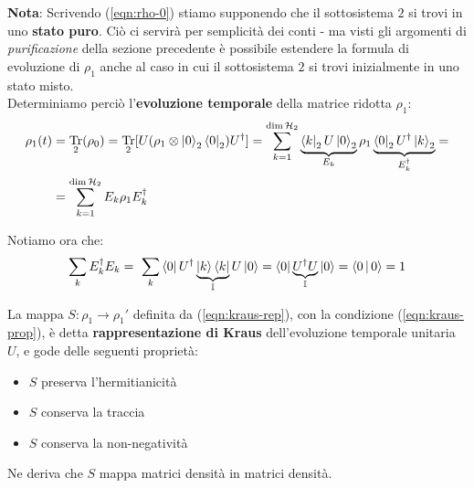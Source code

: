 \documentclass[../../InformazioneQuantistica.tex]{subfiles}
\begin{document}
\textbf{Nota}: Scrivendo (\ref{eqn:rho-0}) stiamo supponendo che il sottosistema $2$ si trovi in uno \textbf{stato puro}. Ciò ci servirà per semplicità dei conti - ma visti gli argomenti di \textit{purificazione} della sezione precedente è possibile estendere la formula di evoluzione di $\rho_1$ anche al caso in cui il sottosistema $2$ si trovi inizialmente in uno stato misto.\\


Determiniamo perciò l'\textbf{evoluzione temporale} della matrice ridotta $\rho_1$:
\begin{align}\nonumber
\rho_1(t) &= \underset{2}{\operatorname{Tr}}(\rho_0) = \underset{2}{\operatorname{Tr}} [U(\rho_1 \otimes \Ket{0}_2\Bra{0}_2)U^\dag ] = \sum_{k=1}^{\operatorname{dim}\mathcal{H}_2} \underbrace{\Bra{k}_2U\Ket{0}_2}_{E_k}\rho_1 \underbrace{\Bra{0}_2U^\dag \Ket{k}_2}_{E_k^\dag} = \\
&= \sum_{k=1}^{\operatorname{dim}\mathcal{H}_2} E_k \rho_1 E_k^\dag
\label{eqn:kraus-rep}
\end{align}

Notiamo ora che:
\begin{align}
\sum_k E_k^\dag E_k =\ \sum_k \Bra{0} U^\dag \underbrace{\Ket{k}\Bra{k}}_{\mathbb{I}}U\Ket{0} = \Bra{0} \underbrace{U^\dag U}_{\mathbb{I}} \Ket{0} = \Braket{0|0} = 1
\label{eqn:kraus-prop}
\end{align}

La mappa $S:\rho_1 \to \rho_1'$ definita da (\ref{eqn:kraus-rep}), con la condizione (\ref{eqn:kraus-prop}), è detta \textbf{rappresentazione di Kraus} dell'evoluzione temporale unitaria $U$, e gode delle seguenti proprietà:
\begin{itemize}
\item $S$ preserva l'hermitianicità
\item $S$ conserva la traccia
\item $S$ conserva la non-negatività
\end{itemize}
Ne deriva che $S$ mappa matrici densità in matrici densità.\\
\end{document}
